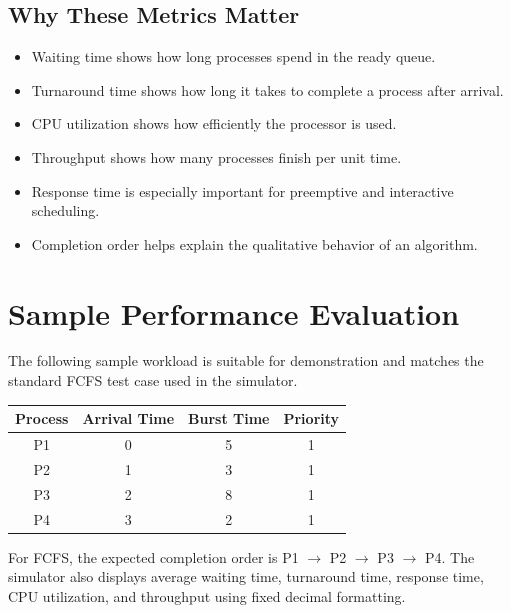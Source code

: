 \documentclass[12pt]{article}
\begin{document}
\subsection{Why These Metrics Matter}
\begin{itemize}[leftmargin=*]
    \item Waiting time shows how long processes spend in the ready queue.
    \item Turnaround time shows how long it takes to complete a process after arrival.
    \item CPU utilization shows how efficiently the processor is used.
    \item Throughput shows how many processes finish per unit time.
    \item Response time is especially important for preemptive and interactive scheduling.
    \item Completion order helps explain the qualitative behavior of an algorithm.
\end{itemize}




\section{Sample Performance Evaluation}
The following sample workload is suitable for demonstration and matches the standard FCFS test case used in the simulator.

\begin{center}
\begin{tabular}{cccc}
\toprule
Process & Arrival Time & Burst Time & Priority \\
\midrule
P1 & 0 & 5 & 1 \\
P2 & 1 & 3 & 1 \\
P3 & 2 & 8 & 1 \\
P4 & 3 & 2 & 1 \\
\bottomrule
\end{tabular}
\end{center}

For FCFS, the expected completion order is P1 $\rightarrow$ P2 $\rightarrow$ P3 $\rightarrow$ P4. The simulator also displays average waiting time, turnaround time, response time, CPU utilization, and throughput using fixed decimal formatting.
\end{document}

